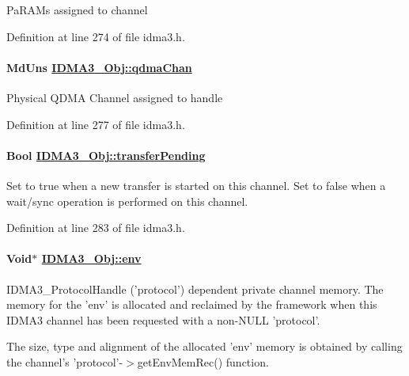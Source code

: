 Pa\-RAMs assigned to channel 

Definition at line 274 of file idma3.h.\hypertarget{struct_i_d_m_a3___obj_fd4af47b5c6adf5d99702f4b290019dd}{
\paragraph[qdmaChan]{\setlength{\rightskip}{0pt plus 5cm}Md\-Uns \hyperlink{struct_i_d_m_a3___obj_fd4af47b5c6adf5d99702f4b290019dd}{IDMA3\_\-Obj::qdma\-Chan}}\hfill}
\label{struct_i_d_m_a3___obj_fd4af47b5c6adf5d99702f4b290019dd}


Physical QDMA Channel assigned to handle 

Definition at line 277 of file idma3.h.\hypertarget{struct_i_d_m_a3___obj_95914721dbaef8bce045253b0cb81468}{
\paragraph[transferPending]{\setlength{\rightskip}{0pt plus 5cm}Bool \hyperlink{struct_i_d_m_a3___obj_95914721dbaef8bce045253b0cb81468}{IDMA3\_\-Obj::transfer\-Pending}}\hfill}
\label{struct_i_d_m_a3___obj_95914721dbaef8bce045253b0cb81468}


Set to true when a new transfer is started on this channel. Set to false when a wait/sync operation is performed on this channel. 

Definition at line 283 of file idma3.h.\hypertarget{struct_i_d_m_a3___obj_900c29cb46bab73d88002d88a5ca41a0}{
\paragraph[env]{\setlength{\rightskip}{0pt plus 5cm}Void$\ast$ \hyperlink{struct_i_d_m_a3___obj_900c29cb46bab73d88002d88a5ca41a0}{IDMA3\_\-Obj::env}}\hfill}
\label{struct_i_d_m_a3___obj_900c29cb46bab73d88002d88a5ca41a0}


IDMA3\_\-Protocol\-Handle ('protocol') dependent private channel memory. The memory for the 'env' is allocated and reclaimed by the framework when this IDMA3 channel has been requested with a non-NULL 'protocol'.

The size, type and alignment of the allocated 'env' memory is obtained by calling the channel's 'protocol'-$>$get\-Env\-Mem\-Rec() function.


